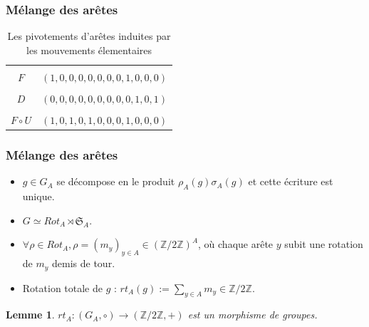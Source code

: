 \documentclass[10pt,notheorems]{beamer}
\theoremstyle{plain}
\theoremstyle{definition}
\theoremstyle{plain}
\theoremstyle{plain}
\newtheorem{lemma}{Lemme}
\theoremstyle{plain}
\theoremstyle{remark}
\begin{document}
\begin{frame}
  \frametitle{Mélange des arêtes}
  \begin{table}[h!]
    \centering
    \begin{tabular}{|c|c|}
      \hline \\
      $F$ & $(1,0,0,0,0,0,0,0,1,0,0,0)$ \\
      \hline \\
      $D$ & $(0,0,0,0,0,0,0,0,0,1,0,1)$ \\
      \hline \\
      $F \circ U$ & $(1,0,1,0,1,0,0,0,1,0,0,0)$ \\
      \hline
    \end{tabular}

    \caption{Les pivotements d'arêtes induites par les mouvements élementaires}
    \label{tableau_orientations_aretes}

  \end{table}

\end{frame}

\begin{frame}
  \frametitle{Mélange des arêtes}
  \begin{itemize}
    \item $g \in G_A$ se décompose en le produit $\rho_A(g) \sigma_A(g)$ et cette écriture est unique.
    \item $G \simeq Rot_A \rtimes \mathfrak{S}_{A} $.
    \item $\forall \rho \in Rot_A, \rho = (m_y) _{y \in A} \in (\mathbb{Z}/{ 2 }\mathbb{Z}) ^{A}$, où chaque arête $y$ subit une rotation de $ m_y$ demis de tour.
    \item Rotation totale de $g$ : $rt_A(g) := \sum_{y \in A} m_y \in \mathbb{Z}/{ 2 }\mathbb{Z} $.
  \end{itemize}

  \begin{lemma}
    $rt_A : (G_A, \circ) \to (\mathbb{Z}/{ 2 }\mathbb{Z}, +)$ est un morphisme de groupes.
  \end{lemma}
\end{frame}

\end{document}
